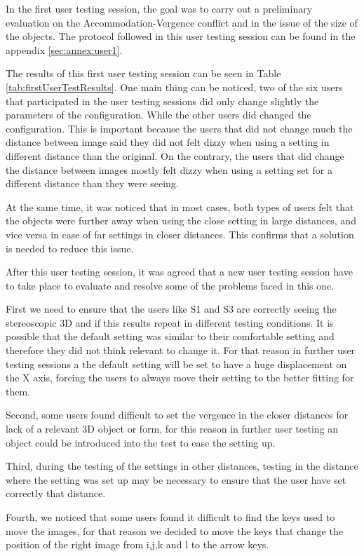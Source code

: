 \documentclass[10pt,a4paper,twocolumn,twoside]{article}
\begin{document}
	In the first user testing session, the goal was to carry out a preliminary evaluation on the Accommodation-Vergence conflict and in the issue of the size of the objects. The protocol followed in this user testing session can be found in the appendix \ref{sec:annex:user1}.
	
	The results of this first user testing session can be seen in Table \ref{tab:firstUserTestResults}. One main thing can be noticed, two of the six users that participated in the user testing sessions did only change slightly the parameters of the configuration. 
	While the other users did changed the configuration. This is important because the users that did not change much the distance between image said they did not felt dizzy when using a setting in different distance than the original. On the contrary, the users that did change the distance between images mostly felt dizzy when using a setting set for a different distance than they were seeing.
	
	At the same time, it was noticed that in most cases, both types of users felt that the objects were further away when using the close setting in large distances, and vice versa in case of far settings in closer distances. This confirms that a solution is needed to reduce this issue. 
	
	After this user testing session, it was agreed that a new user testing session have to take place to evaluate and resolve some of the problems faced in this one. 

	First we need to ensure that the users like S1 and S3 are correctly seeing the stereoscopic 3D and if this results repeat in different testing conditions. It is possible that the default setting was similar to their comfortable setting and therefore they did not think relevant to change it. For that reason in further user testing sessions a the default setting will be set to have a huge displacement on the X axis, forcing the users to always move their setting to the better fitting for them.
	
	Second, some users found difficult to set the vergence in the closer distances for lack of a relevant 3D object or form, for this reason in further user testing an object could be introduced into the test to ease the setting up. 
	
	Third, during the testing of the settings in other distances, testing in the distance where the setting was set up may be necessary to ensure that the user have set correctly that distance.
	
	Fourth, we noticed that some users found it difficult to find the keys used to move the images, for that reason we decided to move the keys that change the position of the right image from i,j,k and l to the arrow keys. 
	
\end{document}
